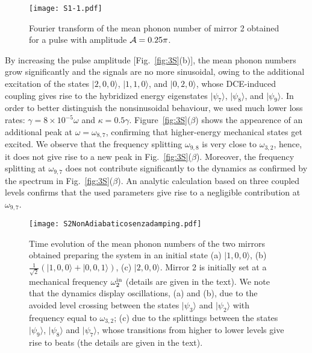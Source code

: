 \documentclass[aps,pra,twocolumn,floatfix,longbibliography, superscriptaddress]{revtex4-1}
\newcommand{\ket}[1]{|#1\rangle}
\begin{document}
\begin{figure}[H]
	\centering
	\texttt{[image: S1-1.pdf]} %
	\caption{
		Fourier transform of the mean phonon number of mirror 2  obtained for a pulse with amplitude ${\cal A} = 0.25 \pi$.}\label{M2FT}
\end{figure}

By increasing the pulse amplitude [Fig.~\ref{fig:3S}(b)], the mean phonon numbers grow significantly and the signals are no more sinusoidal, owing to the additional excitation of the states $|2,0,0 \rangle$, $|1,1,0 \rangle$, and $|0,2,0 \rangle$, whose DCE-induced coupling gives rise to the hybridized energy eigenstates $|\psi_7 \rangle$, $|\psi_8 \rangle$, and $|\psi_9 \rangle$. In order to better distinguish the nonsinusoidal behaviour, we used much lower loss rates:  $\gamma = 8 \times 10^{-5} \omega$ and $\kappa= 0.5 \gamma$. Figure~\ref{fig:3S}($\beta$) shows the appearence of an additional peak at $\omega= \omega_{8,7}$, confirming that higher-energy mechanical states get excited. We observe that the frequency splitting $\omega_{9,8}$ is very close to $\omega_{3,2}$, hence, it does not give rise to a new peak in Fig.~\ref{fig:3S}($\beta$). Moreover, the
frequency splitting at $\omega_{9,7}$ does not contribute significantly to the dynamics as confirmed by the spectrum in Fig.~\ref{fig:3S}($\beta$). An analytic calculation based on three coupled levels confirms that the used parameters give rise to a negligible contribution at $\omega_{9,7}$.





\begin{figure} [h!]
	\centering
	\texttt{[image: S2NonAdiabaticosenzadamping.pdf]}
	\caption{
		Time evolution of the mean phonon numbers of the two mirrors obtained preparing the system in an initial state 
		(a) $\ket{1,0,0}$, (b) $\frac{1}{\sqrt{2}}(\ket{1,0,0}+\ket{0,0,1})$, (c) $\ket{2,0,0}$.
		Mirror 2 is initially  set at a mechanical frequency $\omega^{\rm in}_2$ (details are given in the text). We note that  the dynamics display oscillations, (a) and (b),  due to 
		the avoided level crossing between the states $\ket{\psi_3}$ and $\ket{\psi_2}$ with frequency equal to  $\omega_{3,2}$; (c) due to the splittings between the states $\ket{\psi_9}$,  $\ket{\psi_8}$ and $\ket{\psi_7}$, whose transitions from higher to lower levels give rise to beats (the details are given in the text).
	}\label{nonadiabaticnodamping}
\end{figure}
\end{document}
